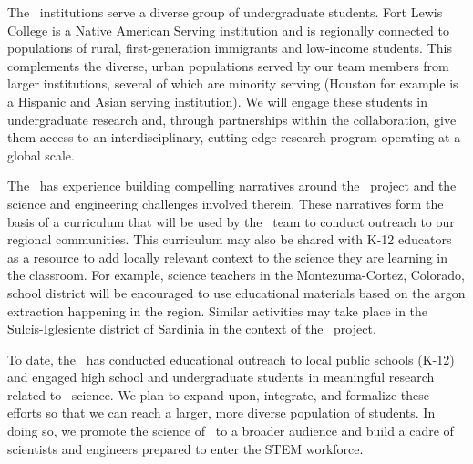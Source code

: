 The \GADMC\ institutions serve a diverse group of undergraduate students. Fort Lewis College is a Native American Serving institution and is regionally connected to populations of rural, first-generation immigrants and low-income students. This complements the diverse, urban populations served by our team members from larger institutions, several of which are minority serving (Houston for example is a Hispanic and Asian serving institution). We will engage these students in undergraduate research and, through partnerships within the collaboration, give them access to an interdisciplinary, cutting-edge research program operating at a global scale.

The \GADMC\ has experience building compelling narratives around the \DSk\ project and the science and engineering challenges involved therein.  These narratives form the basis of a curriculum that will be used by the \DS\ team to conduct outreach to our regional communities. This curriculum may also be shared with K-12 educators as a resource to add locally relevant context to the science they are learning in the classroom.  For example, science teachers in the Montezuma-Cortez, Colorado, school district will be encouraged to use educational materials based on the argon extraction happening in the region.  Similar activities may take place in the Sulcis-Iglesiente district of Sardinia in the context of the \Aria\ project. 

To date, the \GADMC\ has conducted educational outreach to local public schools (K-12) and engaged high school and undergraduate students in meaningful research related to \DSk\ science. %
We plan to expand upon, integrate, and formalize these efforts so that we can reach a larger, more diverse population of students.  In doing so, we promote the science of \GADMC\ to a broader audience and build a cadre of scientists and engineers prepared to enter the STEM workforce.
